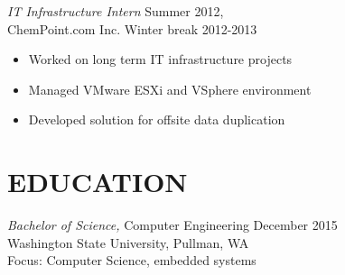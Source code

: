 \documentclass[line, margin]{res}
\begin{document}
\begin{resume}
                {\sl IT Infrastructure Intern} \hfill           Summer 2012,\\
                ChemPoint.com Inc. \hfill Winter break 2012-2013
                 \begin{itemize}  \itemsep -2pt %
                 \item  Worked on long term IT infrastructure projects
                 \item  Managed VMware ESXi and VSphere environment
                 \item  Developed solution for offsite data duplication
                 \end{itemize} 

\section{EDUCATION} {\sl Bachelor of Science,} Computer Engineering \hfill December 2015 \\
                Washington State University, Pullman, WA\\
                Focus: Computer Science, embedded systems
 


\end{resume}
\end{document}
